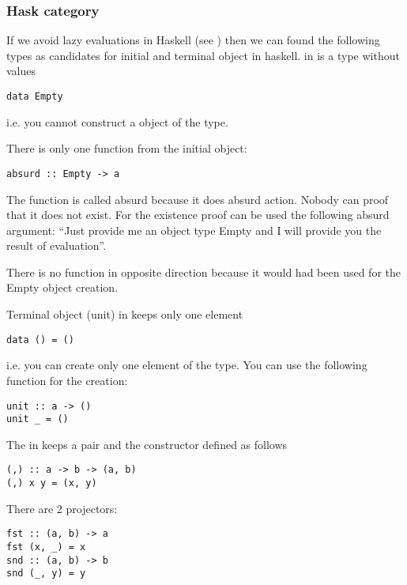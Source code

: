 \subsubsection{\textbf{Hask} category}
\begin{example}
If we avoid lazy evaluations in Haskell (see
) then we can found the following types
as candidates for initial and terminal object in haskell. 
\label{ex:hask_initial_object}
 in  is a
type without values 
\begin{verbatim}
data Empty
\end{verbatim}
i.e. you cannot construct a object of the type.

There is only one function from the initial object:
\begin{verbatim}
absurd :: Empty -> a
\end{verbatim}
The function is called absurd because it does absurd action. Nobody
can proof that it does not exist. For the existence proof can be used
the following absurd argument: ``Just provide me an object type Empty
and I will provide you the result of evaluation''. 

There is no function in opposite direction because it would had been
used for the Empty object creation. 
\end{example}

\begin{example}
\label{ex:hask_terminal_object}
Terminal object (unit) in  keeps only one element
\begin{verbatim}
data () = ()
\end{verbatim}
i.e. you can create only one element of the type. You can use the
following function for the creation:
\begin{verbatim}
unit :: a -> ()
unit _ = ()
\end{verbatim}
\end{example}

\begin{example}
\label{ex:hask_product}
The  in  keeps a
pair and the constructor defined as follows
\begin{verbatim}
(,) :: a -> b -> (a, b)
(,) x y = (x, y)
\end{verbatim}
There are 2 projectors: 
\begin{verbatim}
fst :: (a, b) -> a
fst (x, _) = x
snd :: (a, b) -> b
snd (_, y) = y
\end{verbatim}
\end{example}

